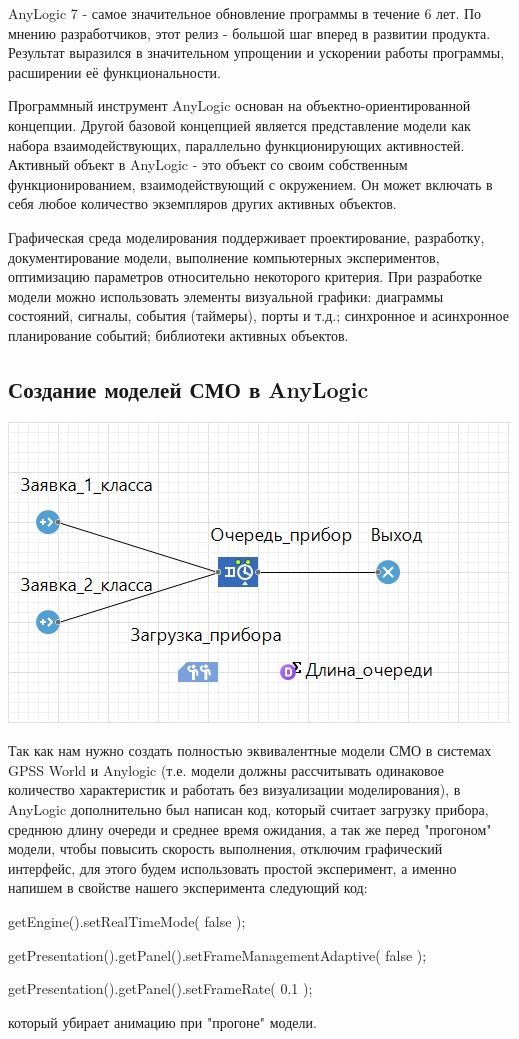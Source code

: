\documentclass[a4paper,14pt]{report} %
\begin{document}
AnyLogic 7 - самое значительное обновление программы в течение 6 лет. По мнению разработчиков, этот релиз - большой шаг вперед в развитии продукта. Результат выразился в значительном упрощении и ускорении работы программы, расширении её функциональности.

Программный инструмент AnyLogic основан на объектно-ориентированной концепции. Другой базовой концепцией является представление модели как набора взаимодействующих, параллельно функционирующих активностей. Активный объект в AnyLogic - это объект со своим собственным функционированием, взаимодействующий с окружением. Он может включать в себя любое количество экземпляров других активных объектов.

Графическая среда моделирования поддерживает проектирование, разработку, документирование модели, выполнение компьютерных экспериментов, оптимизацию параметров относительно некоторого критерия. При разработке модели можно использовать элементы визуальной графики: диаграммы состояний, сигналы, события (таймеры), порты
и т.д.; синхронное и асинхронное планирование событий; библиотеки активных объектов.

\subsection{Создание моделей СМО в AnyLogic}
\includegraphics[width=0.5\linewidth]{model_AnyLogic}

Так как нам нужно создать полностью эквивалентные модели СМО в системах GPSS World и Anylogic (т.е. модели должны рассчитывать одинаковое количество характеристик и работать без визуализации моделирования), в AnyLogic дополнительно был написан код, который считает загрузку прибора, среднюю длину очереди и среднее время ожидания, а так же перед "прогоном" модели, чтобы повысить скорость выполнения, отключим графический интерфейс, для этого будем использовать простой эксперимент, а именно напишем в свойстве нашего эксперимента следующий код:\par
getEngine().setRealTimeMode( false );\par
getPresentation().getPanel().setFrameManagementAdaptive( false );\par
getPresentation().getPanel().setFrameRate( 0.1 );\par\noindent
который убирает анимацию при "прогоне" модели.
\end{document}
